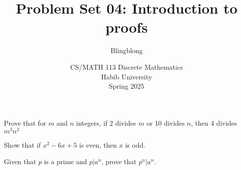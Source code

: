 \documentclass[a4paper]{exam}
\title{Problem Set 04: Introduction to proofs}
\author{Blingblong} %
\date{CS/MATH 113 Discrete Mathematics\\Habib University\\Spring 2025}
\begin{document}
\maketitle



\begin{questions}

    \question[3] Prove that for $m$ and $n$ integers, if 2 divides $m$ or 10 divides $n$, then 4 divides $m^{3}n^{2}$
    \begin{solution}
    \end{solution}

    \question[3] Show that if $x^{2} - 6x + 5$ is even, then $x$ is odd.
    \begin{solution}
    \end{solution}

    \question[4] Given that $p$ is a prime and $p|a^n$, prove that $p^n|a^n$. 
    \begin{solution}
    \end{solution}


    
\end{questions}
\end{document}
